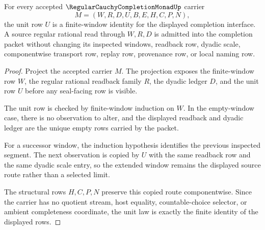\begin{theorem}
\label{thm:regular-cauchy-completion-monad-unit-laws}
For every accepted $\RegularCauchyCompletionMonadUp$ carrier
$$
M=(W,R,D,U,B,E,H,C,P,N),
$$
the unit row $U$ is a finite-window identity for the displayed completion interface. A source regular rational read through $W,R,D$ is admitted into the completion packet without changing its inspected windows, readback row, dyadic scale, componentwise transport row, replay row, provenance row, or local naming row.
\end{theorem}
\begin{proof}
Project the accepted carrier $M$. The projection exposes the finite-window row $W$, the regular rational readback family $R$, the dyadic ledger $D$, and the unit row $U$ before any seal-facing row is visible.

The unit row is checked by finite-window induction on $W$. In the empty-window case, there is no observation to alter, and the displayed readback and dyadic ledger are the unique empty rows carried by the packet.

For a successor window, the induction hypothesis identifies the previous inspected segment. The next observation is copied by $U$ with the same readback row and the same dyadic scale entry, so the extended window remains the displayed source route rather than a selected limit.

The structural rows $H,C,P,N$ preserve this copied route componentwise. Since the carrier has no quotient stream, host equality, countable-choice selector, or ambient completeness coordinate, the unit law is exactly the finite identity of the displayed rows.
\end{proof}

